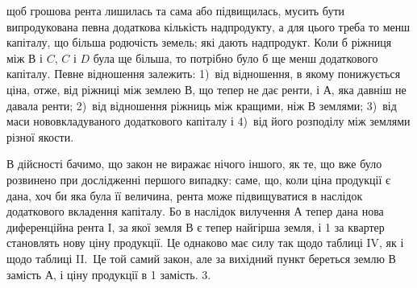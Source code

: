 \parcont{}  %
щоб грошова рента лишилась та сама або підвищилась, мусить бути випродукована
певна додаткова кількість надпродукту, а для цього треба то менш
капіталу, що більша родючість земель; які дають надпродукт. Коли б ріжниця
між $В$ і $C$, $C$ і $D$ була ще більша, то потрібно було б ще менш додаткового
капіталу. Певне відношення залежить: 1)~від відношення, в якому понижується
ціна, отже, від ріжниці між землею $В$, що тепер не дає ренти, і $А$, яка давніш
не давала ренти; 2)~від відношення ріжниць між кращими, ніж $В$ землями; 3)~від
маси нововкладуваного додаткового капіталу і 4)~від його розподілу між землями
різної якости.

В дійсності бачимо, що закон не виражає нічого іншого, як те, що вже
було розвинено при дослідженні першого випадку: саме, що, коли ціна продукції
є дана, хоч би яка була її величина, рента може підвищуватися в наслідок
додаткового вкладення капіталу. Бо в наслідок вилучення $А$ тепер дана нова диференційна
рента І, за якої земля $В$ є тепер найгірша земля, і 1 за
квартер становлять нову ціну продукції. Це однаково має силу так щодо таблиці
IV, як і щодо таблиці II.~Це той самий закон, але за вихідний
пункт береться землю $В$ замість $А$, і ціну продукції в 1 замість.
3.

